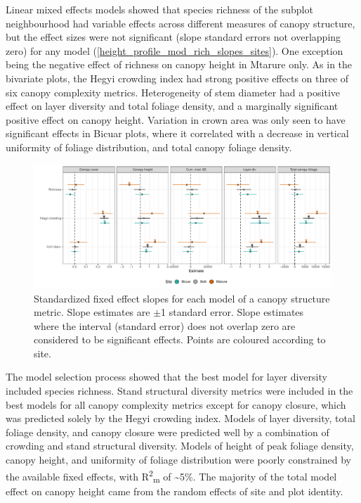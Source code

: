 \documentclass[11pt,a4paper]{article}
\begin{document}
Linear mixed effects models showed that species richness of the subplot neighbourhood had variable effects across different measures of canopy structure, but the effect sizes were not significant (slope standard errors not overlapping zero) for any model (\autoref{height_profile_mod_rich_slopes_sites}). One exception being the negative effect of richness on canopy height in Mtarure only. As in the bivariate plots, the Hegyi crowding index had strong positive effects on three of six canopy complexity metrics. Heterogeneity of stem diameter had a positive effect on layer diversity and total foliage density, and a marginally significant positive effect on canopy height. Variation in crown area was only seen to have significant effects in Bicuar plots, where it correlated with a decrease in vertical uniformity of foliage distribution, and total canopy foliage density.

\begin{figure}
	\includegraphics[width=\textwidth]{height_profile_mod_rich_slopes_sites}
	\caption{Standardized fixed effect slopes for each model of a canopy structure metric. Slope estimates are $\pm$1 standard error. Slope estimates where the interval (standard error) does not overlap zero are considered to be significant effects. Points are coloured according to site.}
	\label{height_profile_mod_rich_slopes_sites}
\end{figure}

The model selection process showed that the best model for layer diversity included species richness. Stand structural diversity metrics were included in the best models for all canopy complexity metrics except for canopy closure, which was predicted solely by the Hegyi crowding index. Models of layer diversity, total foliage density, and canopy closure were predicted well by a combination of crowding and stand structural diversity. Models of height of peak foliage density, canopy height, and uniformity of foliage distribution were poorly constrained by the available fixed effects, with R\textsuperscript{2}\textsubscript{m} of \textasciitilde{}5\%. The majority of the total model effect on canopy height came from the random effects of site and plot identity.
\end{document}
